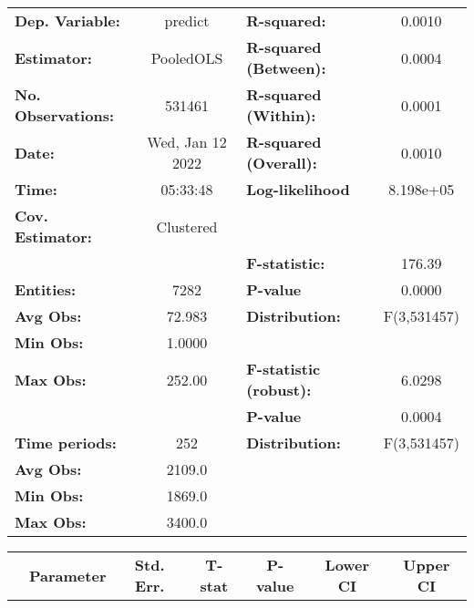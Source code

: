 \begin{center}
\begin{tabular}{lclc}
\toprule
\textbf{Dep. Variable:}    &      predict       & \textbf{  R-squared:         }   &      0.0010      \\
\textbf{Estimator:}        &     PooledOLS      & \textbf{  R-squared (Between):}  &      0.0004      \\
\textbf{No. Observations:} &       531461       & \textbf{  R-squared (Within):}   &      0.0001      \\
\textbf{Date:}             &  Wed, Jan 12 2022  & \textbf{  R-squared (Overall):}  &      0.0010      \\
\textbf{Time:}             &      05:33:48      & \textbf{  Log-likelihood     }   &    8.198e+05     \\
\textbf{Cov. Estimator:}   &     Clustered      & \textbf{                     }   &                  \\
\textbf{}                  &                    & \textbf{  F-statistic:       }   &      176.39      \\
\textbf{Entities:}         &        7282        & \textbf{  P-value            }   &      0.0000      \\
\textbf{Avg Obs:}          &       72.983       & \textbf{  Distribution:      }   &   F(3,531457)    \\
\textbf{Min Obs:}          &       1.0000       & \textbf{                     }   &                  \\
\textbf{Max Obs:}          &       252.00       & \textbf{  F-statistic (robust):} &      6.0298      \\
\textbf{}                  &                    & \textbf{  P-value            }   &      0.0004      \\
\textbf{Time periods:}     &        252         & \textbf{  Distribution:      }   &   F(3,531457)    \\
\textbf{Avg Obs:}          &       2109.0       & \textbf{                     }   &                  \\
\textbf{Min Obs:}          &       1869.0       & \textbf{                     }   &                  \\
\textbf{Max Obs:}          &       3400.0       & \textbf{                     }   &                  \\
\bottomrule
\end{tabular}
\begin{tabular}{lcccccc}
                & \textbf{Parameter} & \textbf{Std. Err.} & \textbf{T-stat} & \textbf{P-value} & \textbf{Lower CI} & \textbf{Upper CI}  \\

\end{tabular}
\end{center}
